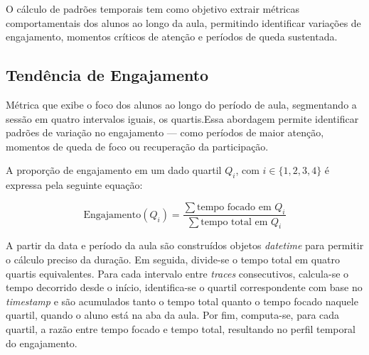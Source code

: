 O cálculo de padrões temporais tem como objetivo extrair métricas comportamentais dos alunos ao longo da aula, permitindo identificar variações de engajamento, momentos críticos de atenção e períodos de queda sustentada.

\subsection{Tendência de Engajamento}
Métrica que exibe o foco dos alunos ao longo do período de aula, segmentando a sessão em quatro intervalos iguais, os quartis.Essa abordagem permite identificar padrões de variação no engajamento — como períodos de maior atenção, momentos de queda de foco ou recuperação da participação.

A proporção de engajamento em um dado quartil $Q_i$, com $i \in \{1,2,3,4\}$ é expressa pela seguinte equação:

\begin{equation}\label{eq:engagement_trend}
\text{Engajamento}(Q_i) = \frac{\sum \text{tempo focado em } Q_i}{\sum \text{tempo total em } Q_i}
\end{equation}

% 

A partir da data e período da aula são construídos objetos \textit{datetime} para permitir o cálculo preciso da duração. Em seguida, divide-se o tempo total em quatro quartis equivalentes. Para cada intervalo entre \textit{traces} consecutivos, calcula-se o tempo decorrido desde o início, identifica-se o quartil correspondente com base no \textit{timestamp} e são acumulados tanto o tempo total quanto o tempo focado naquele quartil, quando o aluno está na aba da aula. Por fim, computa-se, para cada quartil, a razão entre tempo focado e tempo total, resultando no perfil temporal do engajamento.


